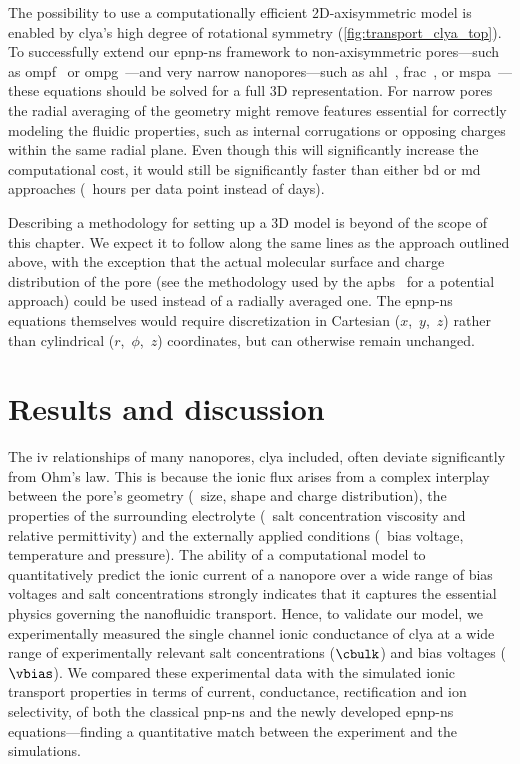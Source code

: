 The possibility to use a computationally efficient 2D-axisymmetric model is enabled by \gls{clya}'s high
degree of rotational symmetry (\cref{fig:transport_clya_top}). To successfully extend our \gls{epnp-ns}
framework to non-axisymmetric pores---such as \gls{ompf}~\cite{Yamashita-2008} or
\gls{ompg}~\cite{Subbarao-2006}---and very narrow nanopores---such as \gls{ahl}~\cite{Song-1996},
\gls{frac}~\cite{Tanaka-2015}, or \gls{mspa}~\cite{Faller-2004}---these equations should be solved for a full
3D representation. For narrow pores the radial averaging of the geometry might remove features essential for
correctly modeling the fluidic properties, such as internal corrugations or opposing charges within the same
radial plane. Even though this will significantly increase the computational cost, it would still be
significantly faster than either \gls{bd} or \gls{md} approaches (\ie~hours per data point instead of days).

Describing a methodology for setting up a 3D model is beyond of the scope of this chapter. We expect it to
follow along the same lines as the approach outlined above, with the exception that the actual molecular
surface and charge distribution of the pore (see the methodology used by the
\gls{apbs}~\cite{Baker-2001,Jurrus-2018} for a potential approach) could be used instead of a radially
averaged one. The \gls{epnp-ns} equations themselves would require discretization in Cartesian ($x$,~$y$,~$z$)
rather than cylindrical ($r$,~$\phi$,~$z$) coordinates, but can otherwise remain unchanged.


\section{Results and discussion}
%
\label{sec:transport:results}
%

The \gls{iv} relationships of many nanopores, \gls{clya} included, often deviate significantly from Ohm's law.
This is because the ionic flux arises from a complex interplay between the pore's geometry (\eg~size, shape
and charge distribution), the properties of the surrounding electrolyte (\eg~salt concentration viscosity and
relative permittivity) and the externally applied conditions (\eg~bias voltage, temperature and pressure). The
ability of a computational model to quantitatively predict the ionic current of a nanopore over a wide range
of bias voltages and salt concentrations strongly indicates that it captures the essential physics governing
the nanofluidic transport. Hence, to validate our model, we experimentally measured the single channel ionic
conductance of \gls{clya} at a wide range of experimentally relevant salt concentrations ($\cbulk$) and bias
voltages ($\vbias$). We compared these experimental data with the simulated ionic transport properties in
terms of current, conductance, rectification and ion selectivity, of both the classical \gls{pnp-ns} and the
newly developed \gls{epnp-ns} equations---finding a quantitative match between the experiment and the
simulations.

